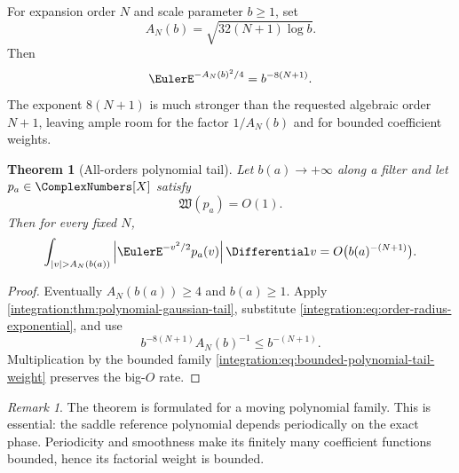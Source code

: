 \documentclass[11pt,oneside]{article}
\newtheorem{theorem}{Theorem}[section]
\theoremstyle{definition}
\theoremstyle{remark}
\newtheorem{remark}[remark]{Remark}
\begin{document}
For expansion order $N$ and scale parameter $b\ge1$, set
\begin{equation}
 A_N(b)=\sqrt{32(N+1)\log b}.
 \label{integration:eq:order-central-radius}
\end{equation}
Then
\begin{equation}
 \EulerE^{-A_N(b)^2/4}=b^{-8(N+1)}.
 \label{integration:eq:order-radius-exponential}
\end{equation}
The exponent $8(N+1)$ is much stronger than the requested algebraic order $N+1$, leaving
ample room for the factor $1/A_N(b)$ and for bounded coefficient weights.

\begin{theorem}[All-orders polynomial tail]
\label{integration:thm:all-orders-polynomial-tail}
Let $b(a)\to+\infty$ along a filter and let $p_a\in\ComplexNumbers[X]$ satisfy
\begin{equation}
 \mathfrak W(p_a)=O(1).
 \label{integration:eq:bounded-polynomial-tail-weight}
\end{equation}
Then for every fixed $N$,
\begin{equation}
 \int_{|v|>A_N(b(a))}
 \left|\EulerE^{-v^2/2}p_a(v)\right|\Differential v
 =O\bigl(b(a)^{-(N+1)}\bigr).
 \label{integration:eq:all-orders-polynomial-tail}
\end{equation}
\end{theorem}

\begin{proof}
Eventually $A_N(b(a))\ge4$ and $b(a)\ge1$.  Apply
\cref{integration:thm:polynomial-gaussian-tail}, substitute
\eqref{integration:eq:order-radius-exponential}, and use
\[
 b^{-8(N+1)}A_N(b)^{-1}\le b^{-(N+1)}.
\]
Multiplication by the bounded family \eqref{integration:eq:bounded-polynomial-tail-weight} preserves the
big-$O$ rate.
\end{proof}

\begin{remark}
The theorem is formulated for a moving polynomial family.  This is essential: the saddle
reference polynomial depends periodically on the exact phase.  Periodicity and smoothness
make its finitely many coefficient functions bounded, hence its factorial weight is bounded.
\end{remark}
\end{document}
